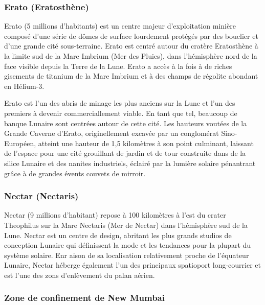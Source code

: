                                                            \subsubsection{Erato (Eratosthène)} \label{sec:erato-eratosthenes} 

                                                            Erato (5 millions d'habitants) est un centre majeur d'exploitation minière composé d'une série de dômes de surface lourdement protégés par des bouclier et d'une grande cité sous-terraine. Erato est centré autour du cratère Eratosthène à la limite sud de la Mare Imbrium (Mer des Pluies), dans l'hémisphère nord de la face visible depuis la Terre de la Lune. Erato a accès à la fois à de riches gisements de titanium de la Mare Imbrium et à des champs de régolite abondant en Hélium-3. 

                                                            Erato est l'un des abris de minage les plus anciens sur la Lune et l'un des premiers à devenir commerciallement viable. En tant que tel, beaucoup de banque Lunaire sont centrées autour de cette cité. Les hauteurs voutées de la Grande Caverne d'Erato, originellement excavée par un conglomérat Sino-Européen, atteint une hauteur de 1,5 kilomètres à son point culminant, laissant de l'espace pour une cité grouillant de jardin et de tour construite dans de la silice Lunaire et des nanites industriels, éclairé par la lumière solaire pénantrant grâce à de grandes évents couvets de mirroir. 

                                                            \subsubsection{Nectar (Nectaris)} \label{sec:nectar-nectaris} 

                                                            Nectar (9 millions d'habitant) repose à 100 kilomètres à l'est du crater Theophilus sur la Mare Nectaris (Mer de Nectar) dans l'hémisphère sud de la Lune. Nectar est un centre de design, abritant les plus grands studios de conception Lunaire qui définissent la mode et les tendances pour la plupart du système solaire. Enr aison de sa localisation relativement proche de l'équateur Lunaire, Nectar héberge également l'un des principaux spatioport long-courrier et est l'une des zons d'enlèvement du palan aérien. 

                                                            \subsubsection{Zone de confinement de New Mumbai} \label{sec:new-mumb-cont} 

